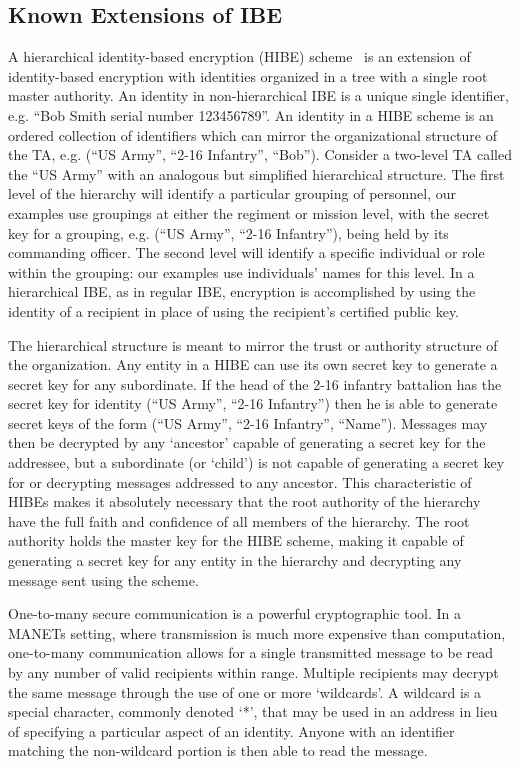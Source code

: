 \documentclass{IEEEtran}
\begin{document}
\subsection{Known Extensions of IBE}
A hierarchical identity-based encryption (HIBE)
scheme~\cite{Horowitz02} is an extension of identity-based
encryption with identities organized in a tree with a single root
master authority. An identity in non-hierarchical IBE is a unique
single identifier, e.g. ``Bob Smith serial number 123456789''. An
identity in a HIBE scheme is an ordered collection of identifiers
which can mirror the organizational structure of the TA, e.g. (``US
Army'', ``2-16 Infantry'', ``Bob''). Consider a two-level TA called
the ``US Army'' with an analogous but simplified hierarchical
structure. The first level of the hierarchy will identify a
particular grouping of personnel, our examples use groupings at
either the regiment or mission level, with the secret key for a
grouping, e.g. (``US Army'', ``2-16 Infantry''), being held by its
commanding officer. The second level will identify a specific
individual or role within the grouping: our examples use
individuals' names for this level. In a hierarchical IBE, as in
regular IBE, encryption is accomplished by using the identity of a
recipient in place of using the recipient's certified public key.

The hierarchical structure is meant to mirror the trust or authority
structure of the organization. Any entity in a HIBE can use its own
secret key to generate a secret key for any subordinate. If the head
of the 2-16 infantry battalion has the secret key for identity (``US
Army'', ``2-16 Infantry'') then he is able to generate secret keys
of the form (``US Army'', ``2-16 Infantry'', ``Name''). Messages may
then be decrypted by any `ancestor' capable of generating a secret
key for the addressee, but a subordinate (or `child') is not capable
of generating a secret key for or decrypting messages addressed to
any ancestor. This characteristic of HIBEs makes it absolutely
necessary that the root authority of the hierarchy have the full
faith and confidence of all members of the hierarchy. The root
authority holds the master key for the HIBE scheme, making it
capable of generating a secret key for any entity in the hierarchy
and decrypting any message sent using the scheme.

One-to-many secure communication is a powerful cryptographic tool.
In a MANETs setting, where transmission is much more expensive than
computation, one-to-many communication allows for a single
transmitted message to be read by any number of valid recipients
within range.  Multiple recipients may decrypt the same message
through the use of one or more `wildcards'. A wildcard is a special
character, commonly denoted `*', that may be used in an address in
lieu of specifying a particular aspect of an identity. Anyone with
an identifier matching the non-wildcard portion is then able to read
the message.
\end{document}
